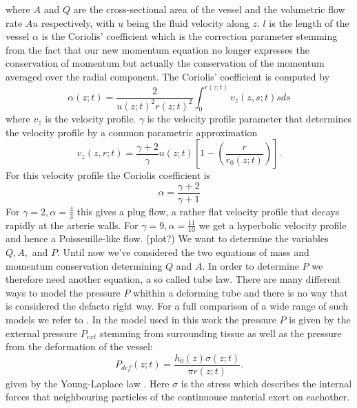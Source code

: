 \documentclass[a4paper, oneside]{discothesis}
\begin{document}
where $A$ and $Q$ are the cross-sectional area of the vessel and the volumetric flow rate $Au$ respectively, with $u$ being the fluid velocity along $z$. $l$ is the length of the vessel
$\alpha$ is the Coriolis' coefficient which is the correction parameter stemming from the fact that our new momentum equation no longer expresses the conservation of momentum but actually the conservation of the momentum averaged over the radial component.
The Coriolis' coefficient is computed by 
\begin{equation}
	\alpha(z;t) = \frac{2}{u(z;t)^2r(z;t)^2} \int_0^{r(z;t)} v_z(z, s; t) sds 
\end{equation}
where $v_z$ is the velocity profile.\cite{article10002407}
$\gamma$ is the velocity profile parameter that determines the velocity profile by a common parametric approximation 
\begin{equation}
	v_z(z,r;t) = \frac{\gamma + 2}{\gamma} u(z;t) \left[ 1 - \left( \frac{r}{r_0(z;t)} \right) \right].
\end{equation}
For this velocity profile the Coriolis coefficient is
\begin{equation}
	\alpha = \frac{\gamma + 2}{\gamma + 1}
\end{equation}
For $\gamma=2, \alpha = \frac{4}{3}$ this gives a plug flow, a rather flat velocity profile that decays rapidly at the arterie walls.
For $\gamma=9, \alpha = \frac{11}{10} $ we get a hyperbolic velocity profile and hence a Poisseuille-like flow. (plot?)\cite{köppl2023dimension}
We want to determine the variables $Q, A,$ and $P$.
Until now we've considered the two equations of mass and momentum conservation determining $Q$ and $A$.
In order to determine $P$ we therefore need another equation, a so called tube law.
There are many different ways to model the pressure $P$ whithin a deforming tube and there is no way that is considered the defacto right way.
For a full comparison of a wide range of such models we refer to \cite{gomez2017analysis}.
In the model used in this work the pressure $P$ is given by the external pressure $P_{ext}$ stemming from surrounding tissue as well as the pressure from the deformation of the vessel:
\begin{equation}
	P_{def}(z;t) = \frac{h_0(z) \sigma(z;t)}{\pi r(z;t)}. \label{eq:pdef}
\end{equation}
given by the Young-Laplace law \cite{laplace1805traité} \cite{young1804essay}.
Here $\sigma$ is the stress which describes the internal forces that neighbouring particles of the continuouse material exert on eachother.
\end{document}

